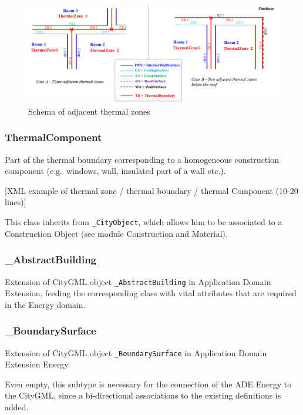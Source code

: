 \documentclass[a4paper,12pt]{article}
\begin{document}
\begin{figure}[htbp]
\centering
\includegraphics{fig/ThermalZoneAdjacency.png}
\caption{Schema of adjacent thermal zones}
\end{figure}

\subsubsection{ThermalComponent}\label{thermalcomponent}

Part of the thermal boundary corresponding to a homogeneous construction
component (e.g.~windows, wall, insulated part of a wall etc.).

{[}XML example of thermal zone / thermal boundary / thermal Component
(10-20 lines){]}

This class inherits from \texttt{\_CityObject}, which allows him to be
associated to a Construction Object (see module Construction and
Material).

\subsubsection{\_AbstractBuilding}\label{abstractbuilding}

Extension of CityGML object \texttt{\_AbstractBuilding} in Application
Domain Extension, feeding the corresponding class with vital attributes
that are required in the Energy domain.

\subsubsection{\_BoundarySurface}\label{boundarysurface}

Extension of CityGML object \texttt{\_BoundarySurface} in Application
Domain Extension Energy.

Even empty, this subtype is necessary for the connection of the ADE
Energy to the CityGML, since a bi-directional associations to the
existing definitions is added.
\end{document}

